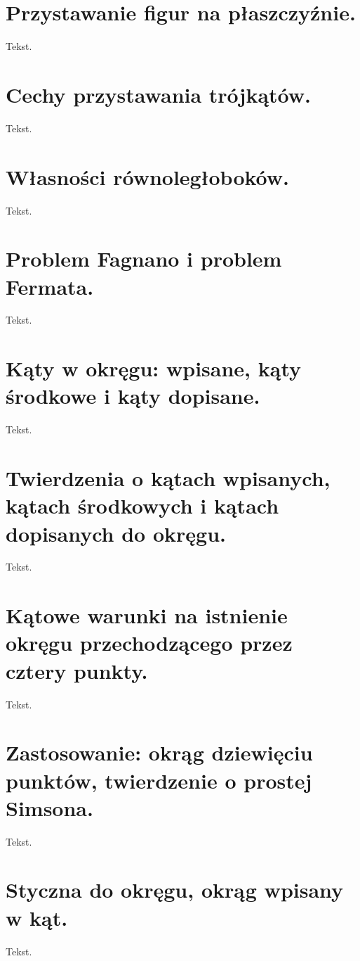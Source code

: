 \documentclass{parchment}
\begin{document}




\section{Przystawanie figur na płaszczyźnie.}
Tekst.

\section{Cechy przystawania trójkątów.}
Tekst.

\section{Własności równoległoboków.}
Tekst.

\section{Problem Fagnano i problem Fermata.}
Tekst.

\section{Kąty w okręgu: wpisane, kąty środkowe i kąty dopisane.}
Tekst.

\section{Twierdzenia o kątach wpisanych, kątach środkowych i kątach dopisanych do okręgu.}
Tekst.

\section{Kątowe warunki na istnienie okręgu przechodzącego przez cztery punkty.}
Tekst.

\section{Zastosowanie: okrąg dziewięciu punktów, twierdzenie o prostej Simsona.}
Tekst.

\section{Styczna do okręgu, okrąg wpisany w kąt.}
Tekst.
\end{document}
